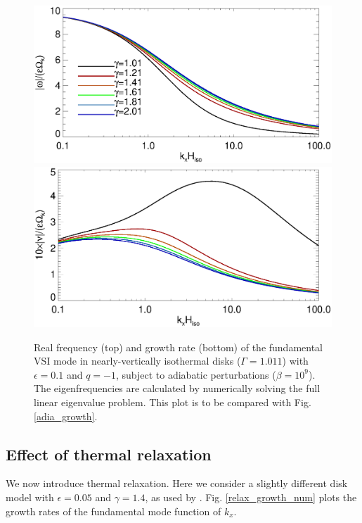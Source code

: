 \begin{figure}
  \includegraphics[width=\linewidth,clip=true,trim=0cm 1.75cm 0cm 0cm]{figures/compare_eigen_real1}
  \includegraphics[width=\linewidth,clip=true,trim=0cm 0cm 0cm 1cm]{figures/compare_eigen_imag1}
  \caption{Real frequency (top) and growth rate 
    (bottom) of the fundamental VSI mode in nearly-vertically   
    isothermal disks ($\Gamma=1.011$) with $\epsilon=0.1$ and  
    $q=-1$, subject to adiabatic perturbations
    ($\beta=10^9$). The eigenfrequencies are calculated by numerically
    solving the full linear eigenvalue problem. This plot is to
    be compared with Fig. \ref{adia_growth}. \label{adia_growth_num}}   
\end{figure}   

\subsection{Effect of thermal relaxation}
We now introduce thermal relaxation. Here we consider a slightly
different disk model with $\epsilon=0.05$ and $\gamma=1.4$, as used by
\cite{nelson13}. Fig. \ref{relax_growth_num} plots the growth rates
of the fundamental mode function of $k_x$. %

